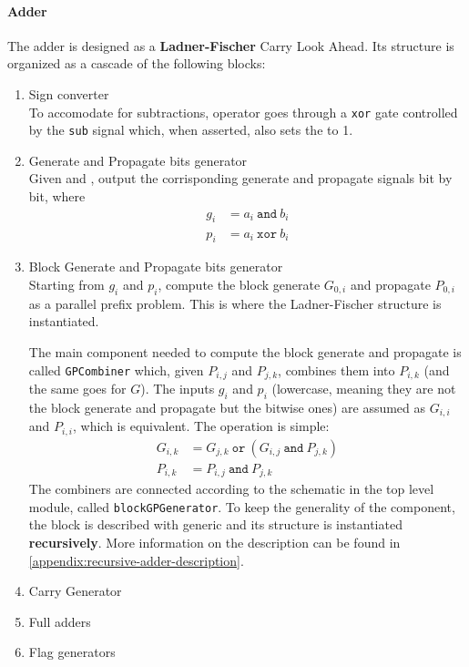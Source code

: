 \paragraph{Adder}
The adder is designed as a \textbf{Ladner-Fischer} Carry Look Ahead. Its structure is organized as a cascade of the following
blocks:
 \begin{enumerate}
    \item Sign converter \\
    To accomodate for subtractions, operator  goes through a \texttt{xor} gate controlled by the
    \texttt{sub} signal which, when asserted, also sets the  to 1.

    \item Generate and Propagate bits generator \\
    Given  and , output the corrisponding generate and propagate signals bit by bit, where
    \begin{align*}
        g_i &= a_i\ \texttt{and}\ b_i \\
        p_i &= a_i\ \texttt{xor}\ b_i
    \end{align*}

    \item Block Generate and Propagate bits generator \\
    Starting from $g_i$ and $p_i$, compute the block generate $G_{0, i}$ and propagate $P_{0, i}$ as a parallel prefix
    problem. This is where the Ladner-Fischer structure is instantiated.

    The main component needed to compute the block generate and propagate is called \texttt{GPCombiner} which, given
    $P_{i, j}$ and $P_{j, k}$, combines them into $P_{i, k}$ (and the same goes for $G$). The inputs $g_i$ and $p_i$
    (lowercase, meaning they are not the block generate and propagate but the bitwise ones) are assumed as $G_{i, i}$
    and $P_{i, i}$, which is equivalent. The operation is simple:
    \begin{align*}
        G_{i, k} &= G_{j, k}\ \texttt{or}\  \left( G_{i, j}\ \texttt{and}\ P_{j, k} \right) \\
        P_{i, k} &= P_{i, j}\ \texttt{and}\ P_{j, k}
    \end{align*}
    The combiners are connected according to the schematic  in the top level module,
    called \texttt{blockGPGenerator}. To keep the generality of the component, the block is described with generic
    and its structure is instantiated \textbf{recursively}. More information on the description can be found in
    \autoref{appendix:recursive-adder-description}.

    \item Carry Generator \\

    \item Full adders \\

    \item Flag generators \\
 \end{enumerate}

